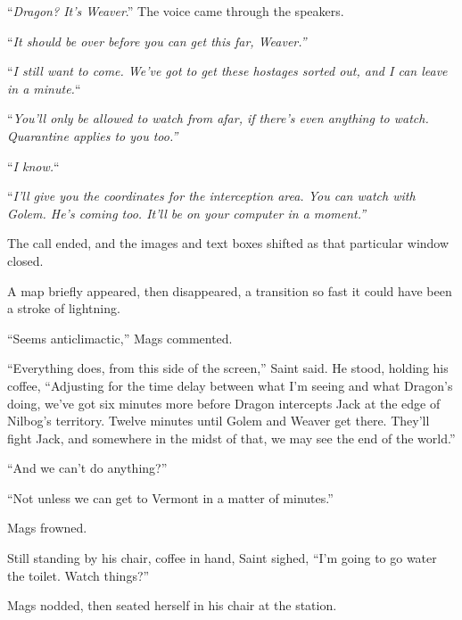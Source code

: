 ``\emph{Dragon?  It's Weaver}.''  The voice came through the speakers.



``\emph{It should be over before you can get this far, Weaver.''}



``\emph{I still want to come.  We've got to get these hostages sorted out, and I can leave in a minute.}``



``\emph{You'll only be allowed to watch from afar, if there's even anything to watch.  Quarantine applies to you too.''}



``\emph{I know.}``



``\emph{I'll give you the coordinates for the interception area.  You can watch with Golem.  He's coming too.  It'll be on your computer in a moment.''}



The call ended, and the images and text boxes shifted as that particular window closed.



A map briefly appeared, then disappeared, a transition so fast it could have been a stroke of lightning.



``Seems anticlimactic,'' Mags commented.



``Everything does, from this side of the screen,'' Saint said.  He stood, holding his coffee, ``Adjusting for the time delay between what I'm seeing and what Dragon's doing, we've got six minutes more before Dragon intercepts Jack at the edge of Nilbog's territory.  Twelve minutes until Golem and Weaver get there.  They'll fight Jack, and somewhere in the midst of that, we may see the end of the world.''



``And we can't do anything?''



``Not unless we can get to Vermont in a matter of minutes.''



Mags frowned.



Still standing by his chair, coffee in hand, Saint sighed, ``I'm going to go water the toilet.  Watch things?''



Mags nodded, then seated herself in his chair at the station.




